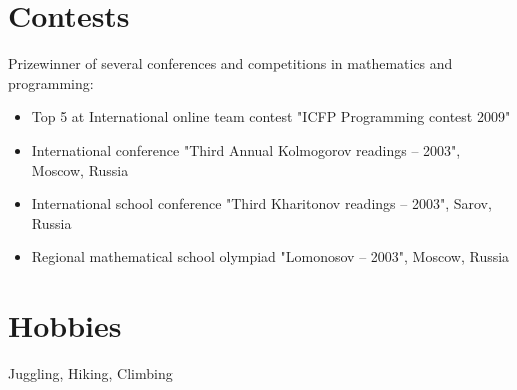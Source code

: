 \documentclass[unicode,a4paper,10pt]{article}
\begin{document}
\section{Contests}
Prizewinner of several conferences and competitions in mathematics and programming:
\begin{itemize}
\item Top 5 at International online team contest "ICFP Programming contest 2009"
\item International conference "Third Annual Kolmogorov readings -- 2003", Moscow, Russia
\item International school conference "Third Kharitonov readings -- 2003", Sarov, Russia
\item Regional mathematical school olympiad "Lomonosov -- 2003", Moscow, Russia
\end{itemize}

\section{Hobbies}
Juggling, Hiking, Climbing



\end{document}

